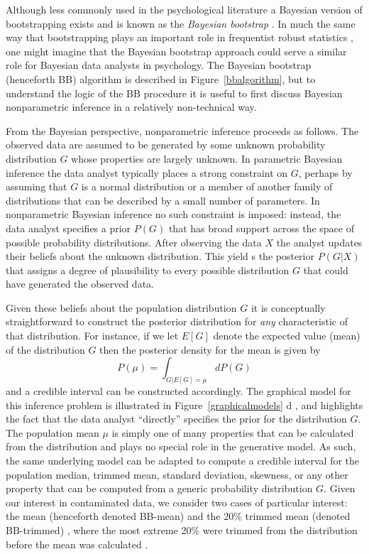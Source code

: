 \documentclass[doc]{apa6}
\begin{document}
{Although less commonly used in the psychological literature \parencite[e.g.,][]{navarro2016learning} a Bayesian version of bootstrapping exists and is known as the {\it Bayesian bootstrap} \parencite{rubin_bayesian_1981}. In much the same way that bootstrapping plays an important role in frequentist robust statistics \parencite{wilcox_introduction_2012}, one might imagine that the Bayesian bootstrap approach could serve a similar role for Bayesian data analysts in psychology. The Bayesian bootstrap (henceforth BB) algorithm is described in Figure~\ref{bbalgorithm}, but to understand the logic of the BB procedure it is useful to first discuss Bayesian nonparametric inference in a relatively non-technical way.

From the Bayesian perspective, nonparametric inference proceeds as follows. The observed data are assumed to be generated by some unknown probability distribution $G$ whose properties are largely unknown. In parametric Bayesian inference the data analyst typically places a strong constraint on $G$, perhaps by assuming that $G$ is a normal distribution or a member of another family of distributions that can be described by a small number of parameters. In nonparametric Bayesian inference no such constraint is imposed: instead, the data analyst specifies a prior $P(G)$ that has broad support across the space of possible probability distributions. After observing the data $X$ the analyst updates their beliefs about the unknown distribution. This yield s   the posterior $P(G|X)$ that assigns a degree of plausibility to every possible distribution $G$ that could have generated the observed data.

Given these beliefs about the population distribution $G$ it is conceptually straightforward to construct the posterior distribution for {\it any} characteristic of that distribution. For instance, if we let $E[G]$ denote the expected value (mean) of the distribution $G$ then the posterior density for the mean is given by
$$
P(\mu) = \int_{G|E[G]=\mu} dP(G)
$$
and a credible interval can be constructed accordingly. The graphical model for this inference problem is illustrated in Figure~\ref{graphicalmodels}  d , and highlights the fact that the data analyst ``directly'' specifies the prior for the distribution $G$. The population mean $\mu$ is simply one of many properties that can be calculated from the distribution and plays no special role in the generative model. As such, the same underlying model can be adapted to compute a credible interval for the population median, trimmed mean, standard deviation, skewness, or any other property that can be computed from a generic probability distribution $G$. Given our interest in contaminated data, we consider two cases of particular interest: the mean (henceforth denoted BB-mean) and the 20\% trimmed mean (denoted BB-trimmed) , where the most extreme 20\% were trimmed from the distribution before the mean was calculated .

}
\end{document}
